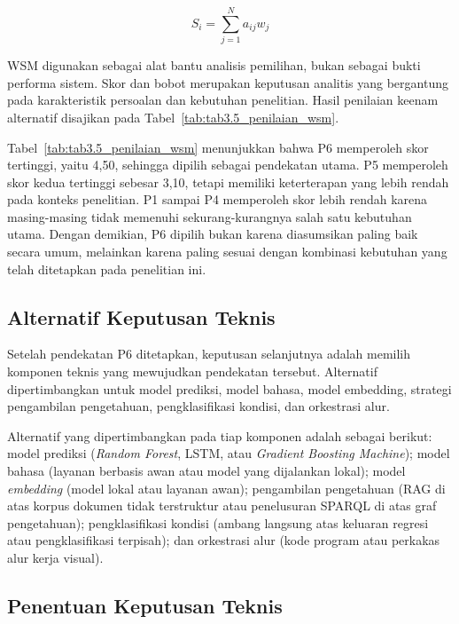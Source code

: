 \begin{equation}
S_i = \sum_{j=1}^{N} a_{ij}w_j
\label{eq:bab3-wsm}
\end{equation}

WSM digunakan sebagai alat bantu analisis pemilihan, bukan sebagai bukti performa sistem. Skor dan bobot merupakan keputusan analitis yang bergantung pada karakteristik persoalan dan
kebutuhan penelitian. Hasil penilaian keenam alternatif disajikan pada Tabel~\ref{tab:tab3.5_penilaian_wsm}.



Tabel~\ref{tab:tab3.5_penilaian_wsm} menunjukkan bahwa P6 memperoleh skor tertinggi, yaitu 4,50, sehingga dipilih sebagai pendekatan utama. P5 memperoleh skor kedua tertinggi sebesar
3,10, tetapi memiliki keterterapan yang lebih rendah pada konteks penelitian. P1 sampai P4 memperoleh skor lebih rendah karena masing-masing tidak memenuhi sekurang-kurangnya 
salah satu kebutuhan utama. Dengan demikian, P6 dipilih bukan karena diasumsikan paling baik secara umum, melainkan karena paling sesuai dengan kombinasi kebutuhan yang telah 
ditetapkan pada penelitian ini.

\subsection{Alternatif Keputusan Teknis}
\label{subsec:bab3-alternatif-keputusan-teknis}

Setelah pendekatan P6 ditetapkan, keputusan selanjutnya adalah memilih komponen teknis yang mewujudkan pendekatan tersebut. Alternatif dipertimbangkan untuk model prediksi, model
bahasa, model embedding, strategi pengambilan pengetahuan, pengklasifikasi kondisi, dan orkestrasi alur.

Alternatif yang dipertimbangkan pada tiap komponen adalah sebagai berikut: model prediksi (\textit{Random Forest}, LSTM, atau \textit{Gradient Boosting Machine}); model bahasa
(layanan berbasis awan atau model yang dijalankan lokal); model \textit{embedding} (model lokal atau layanan awan); pengambilan pengetahuan (RAG di atas korpus dokumen tidak
terstruktur atau penelusuran SPARQL di atas graf pengetahuan); pengklasifikasi kondisi (ambang langsung atas keluaran regresi atau pengklasifikasi terpisah); dan orkestrasi alur
(kode program atau perkakas alur kerja visual).

\subsection{Penentuan Keputusan Teknis}
\label{subsec:bab3-penentuan-keputusan-teknis}

